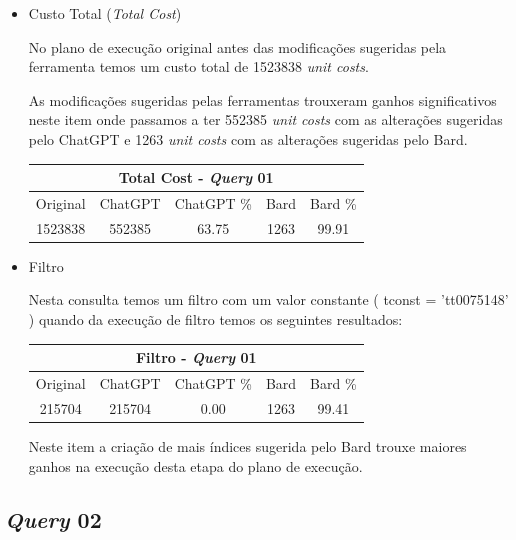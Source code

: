 \documentclass[12pt]{article}
\begin{document}
\begin{itemize}

\item{Custo Total (\emph{Total Cost})}

No plano de execução original antes das modificações sugeridas pela ferramenta temos um custo total de 1523838 \emph{unit costs}.

As modificações sugeridas pelas ferramentas trouxeram ganhos significativos neste item onde passamos a ter 552385 \emph{unit costs} com as alterações sugeridas pelo ChatGPT e 1263 \emph{unit costs} com as alterações sugeridas pelo Bard.
\\
\begin{center}
\begin{tabular}{ |c|c|c|c|c| } 
 \hline
 \multicolumn{5}{|c|}{Total Cost - \emph{Query} 01} \\
 \hline
 Original & ChatGPT & ChatGPT \% & Bard & Bard \% \\ [0.5ex] 
 \hline
 1523838 & 552385 & 63.75 & 1263 & 99.91 \\ 
 \hline
\end{tabular}
\end{center}


\item{Filtro}

Nesta consulta temos um filtro com um valor constante ( tconst = 'tt0075148' ) quando da execução de filtro temos os seguintes resultados:

\begin{center}
\begin{tabular}{ |c|c|c|c|c| } 
 \hline
 \multicolumn{5}{|c|}{Filtro - \emph{Query} 01} \\
 \hline
 Original & ChatGPT & ChatGPT \% & Bard & Bard \% \\ [0.5ex] 
 \hline
 215704 & 215704 & 0.00 & 1263 & 99.41 \\ 
 \hline
\end{tabular}
\end{center}

Neste item a criação de mais índices sugerida pelo Bard trouxe maiores ganhos na execução desta etapa do plano de execução.

\end{itemize}

\subsection{\emph{Query} 02}
\end{document}
